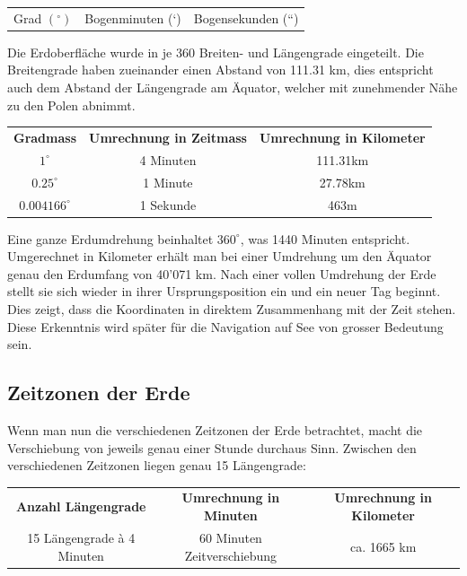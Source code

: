 \begin{refsection}
\begin{center}
\renewcommand{\arraystretch}{1.5}
\begin{tabular}{ccc}
Grad $(^{\circ})$ & Bogenminuten (`) & Bogensekunden (``)
\end{tabular}
\end{center}

Die Erdoberfläche wurde in je 360 Breiten- und Längengrade eingeteilt. Die Breitengrade haben zueinander einen Abstand von 111.31 km, dies entspricht auch dem Abstand der Längengrade am Äquator, welcher mit zunehmender Nähe zu den Polen abnimmt.
\begin{table}[htbp]
\begin{center}
\renewcommand{\arraystretch}{2}
\begin{tabular}{ccc}
\textbf{Gradmass} & \textbf{Umrechnung in Zeitmass} & \textbf{Umrechnung in Kilometer}  \\
$1^{\circ}$ & 4 Minuten & 111.31km \\
$0.25^{\circ}$ & 1 Minute & 27.78km \\
$0.004166^{\circ}$ & 1 Sekunde & 463m 
\label {V7}
\end{tabular}
\end{center}
\end{table}
 
Eine ganze Erdumdrehung beinhaltet $360 ^{\circ}$, was 1440 Minuten entspricht. Umgerechnet in Kilometer erhält man bei einer Umdrehung um den Äquator genau den Erdumfang von 40’071 km.
Nach einer vollen Umdrehung der Erde stellt sie sich wieder in ihrer Ursprungsposition ein und ein neuer Tag beginnt. Dies zeigt, dass die Koordinaten in direktem Zusammenhang mit der Zeit stehen. Diese Erkenntnis wird später für die Navigation auf See von grosser Bedeutung sein.


\subsection{Zeitzonen der Erde} \label{Zeitzonen} 
Wenn man nun die verschiedenen Zeitzonen der Erde betrachtet, macht die Verschiebung von jeweils genau einer Stunde durchaus Sinn.
Zwischen den verschiedenen Zeitzonen liegen genau 15 Längengrade:
\begin{center}
\renewcommand{\arraystretch}{1.5}
\begin{tabular}{ccc}
\textbf{Anzahl Längengrade} & \textbf{Umrechnung in Minuten} & \textbf{Umrechnung in Kilometer}  \\
15 Längengrade à 4 Minuten & 60 Minuten Zeitverschiebung & ca. 1665 km \\
\end{tabular}
\end{center}


\end{refsection}
